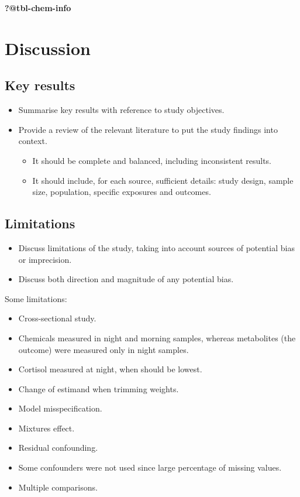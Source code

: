 \documentclass[
  letterpaper,
  DIV=11,
  numbers=noendperiod]{scrartcl}
\providecommand{\tightlist}{%
  \setlength{\itemsep}{0pt}\setlength{\parskip}{0pt}}\usepackage{longtable,booktabs,array}
\begin{document}
\textbf{?@tbl-chem-info}

\section{Discussion}\label{sec-discussion}

\subsection{Key results}\label{sec-disc-res-key}

\begin{itemize}
\tightlist
\item
  Summarise key results with reference to study objectives.
\item
  Provide a review of the relevant literature to put the study findings
  into context.

  \begin{itemize}
  \tightlist
  \item
    It should be complete and balanced, including inconsistent results.
  \item
    It should include, for each source, sufficient details: study
    design, sample size, population, specific exposures and outcomes.
  \end{itemize}
\end{itemize}

\subsection{Limitations}\label{sec-limitations}

\begin{itemize}
\tightlist
\item
  Discuss limitations of the study, taking into account sources of
  potential bias or imprecision.
\item
  Discuss both direction and magnitude of any potential bias.
\end{itemize}

Some limitations:

\begin{itemize}
\tightlist
\item
  Cross-sectional study.
\item
  Chemicals measured in night and morning samples, whereas metabolites
  (the outcome) were measured only in night samples.
\item
  Cortisol measured at night, when should be lowest.
\item
  Change of estimand when trimming weights.
\item
  Model misspecification.
\item
  Mixtures effect.
\item
  Residual confounding.
\item
  Some confounders were not used since large percentage of missing
  values.
\item
  Multiple comparisons.
\end{itemize}
\end{document}
